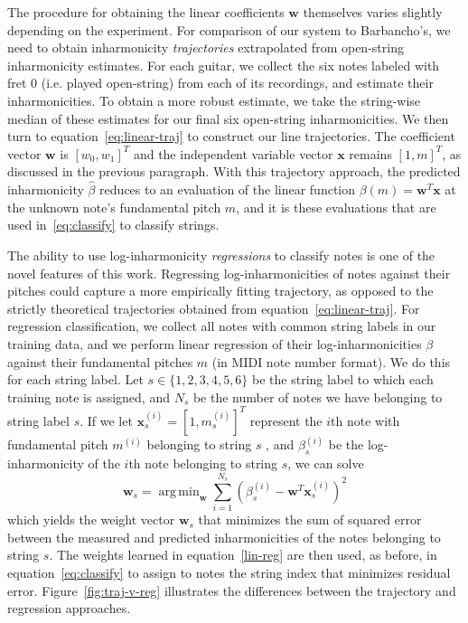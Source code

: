 \documentclass[12pt]{cmuthesis}
\DeclareMathOperator*{\argmin}{arg\,min}
\begin{document}
The procedure for obtaining the linear coefficients $\mathbf{w}$ themselves varies slightly depending on the experiment. For comparison of our system to Barbancho's, we need to obtain inharmonicity \textit{trajectories} extrapolated from open-string inharmonicity estimates. For each guitar, we collect the six notes labeled with fret 0 (i.e. played open-string) from each of its recordings, and estimate their inharmonicities. To obtain a more robust estimate, we take the string-wise median of these estimates for our final six open-string inharmonicities. We then turn to equation~\eqref{eq:linear-traj} to construct our line trajectories. The coefficient vector $\mathbf{w}$ is $[w_0, w_1]^T$ and the independent variable vector $\mathbf{x}$ remains $[1, m]^T$, as discussed in the previous paragraph. With this trajectory approach, the predicted inharmonicity $\hat{\beta}$ reduces to an evaluation of the linear function $\beta(m) = \mathbf{w}^T\mathbf{x}$ at the unknown note's fundamental pitch $m$, and it is these evaluations that are used in~\eqref{eq:classify} to classify strings.

The ability to use log-inharmonicity \textit{regressions} to classify notes is one of the novel features of this work. Regressing log-inharmonicities of notes against their pitches could capture a more empirically fitting trajectory, as opposed to the strictly theoretical trajectories obtained from equation~\eqref{eq:linear-traj}. For regression classification, we collect all notes with common string labels in our training data, and we perform linear regression of their log-inharmonicities $\beta$ against their fundamental pitches $m$ (in MIDI note number format). We do this for each string label. Let $s \in \{1,2,3,4,5,6\}$ be the string label to which each training note is assigned, and $N_s$ be the number of notes we have belonging to string label $s$. If we let $\mathbf{x}_s^{(i)} = [1, m_s^{(i)}]^T$ represent the $i$th note with fundamental pitch $m^{(i)}$ belonging to string $s$ , and $\beta_s^{(i)}$ be the log-inharmonicity of the $i$th note belonging to string $s$, we can solve
\begin{equation}
\label{lin-reg}
\mathbf{w}_s = \argmin_{\mathbf{w}}{\sum_{i=1}^{N_s}{(\beta^{(i)}_s - \mathbf{w}^T\mathbf{x}^{(i)}_s)^2}}
\end{equation}
which yields the weight vector $\mathbf{w}_s$ that minimizes the sum of squared error between the measured and predicted inharmonicities of the notes belonging to string $s$. The weights learned in equation~\eqref{lin-reg} are then used, as before, in equation~\eqref{eq:classify} to assign to notes the string index that minimizes residual error. Figure~\ref{fig:traj-v-reg} illustrates the differences between the trajectory and regression approaches.
\end{document}
